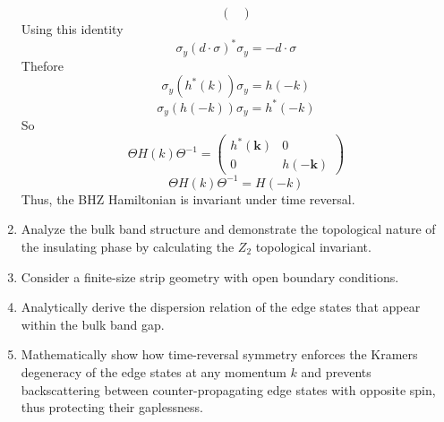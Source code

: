 \documentclass[a4paper,12pt]{article}
\begin{document}
\begin{enumerate}
\[\begin{pmatrix}
\end{pmatrix}\]
Using this identity\\
\[\sigma_{y}( d \cdot \sigma)^{\ast} \sigma_{y} = - d \cdot \sigma
\]
Thefore\\
\[\sigma_{y}( h^{\ast}(k)) \sigma_{y} = h(-k)
\]
\[\sigma_{y}( h(-k)) \sigma_{y} = h^{\ast}(-k)
\]So\\
\[ \Theta H(k)\Theta^{-1} = \begin{pmatrix}
h^{\ast}(\mathbf{k}) & 0\\
0 & h(-\mathbf{k})
\end{pmatrix}\]
\[\Theta H(k)\Theta^{-1}= H(-k)\]
Thus, the BHZ Hamiltonian is invariant under time reversal.
    \item Analyze the bulk band structure and demonstrate the topological nature of the insulating phase by calculating the $Z_2$ topological invariant.

    \item Consider a finite-size strip geometry with open boundary conditions.

    \item Analytically derive the dispersion relation of the edge states that appear within the bulk band gap.

    \item Mathematically show how time-reversal symmetry enforces the Kramers degeneracy of the edge states at any momentum $k$ and prevents backscattering between counter-propagating edge states with opposite spin, thus protecting their gaplessness.
\end{enumerate}
\end{document}
